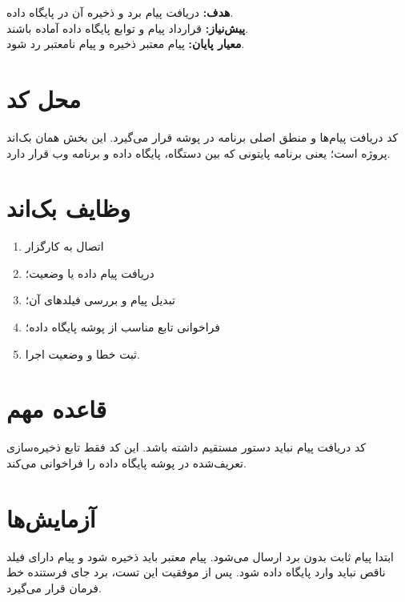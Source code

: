 \begin{phasebox}
\textbf{هدف:} دریافت پیام برد و ذخیره آن در پایگاه داده.\\
\textbf{پیش‌نیاز:} قرارداد پیام و توابع پایگاه داده آماده باشند.\\
\textbf{معیار پایان:} پیام معتبر ذخیره و پیام نامعتبر رد شود.
\end{phasebox}

\section{محل کد}
کد دریافت پیام‌ها و منطق اصلی برنامه در پوشه
قرار می‌گیرد. این بخش همان بک‌اند پروژه است؛ یعنی برنامه پایتونی که بین دستگاه، پایگاه داده و برنامه وب قرار دارد.

\section{وظایف بک‌اند}
\begin{enumerate}
    \item اتصال به کارگزار
    \item دریافت پیام داده یا وضعیت؛
    \item تبدیل پیام
    و بررسی فیلدهای آن؛
    \item فراخوانی تابع مناسب از پوشه پایگاه داده؛
    \item ثبت خطا و وضعیت اجرا.
\end{enumerate}

\section{قاعده مهم}
کد دریافت پیام نباید دستور مستقیم
داشته باشد. این کد فقط تابع ذخیره‌سازی تعریف‌شده در پوشه پایگاه داده را فراخوانی می‌کند.

\section{آزمایش‌ها}
ابتدا پیام ثابت بدون برد ارسال می‌شود. پیام معتبر باید ذخیره شود و پیام دارای فیلد ناقص نباید وارد پایگاه داده شود. پس از موفقیت این تست، برد جای فرستنده خط فرمان قرار می‌گیرد.
